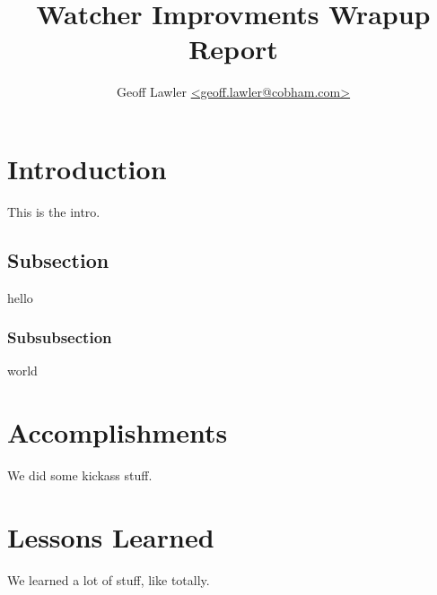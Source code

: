 \documentclass{report}
\author{Geoff Lawler \url{<geoff.lawler@cobham.com>}}
\title{Watcher Improvments Wrapup Report}
\begin{document}
\maketitle

\renewcommand*\thesection{\arabic{section}}

\section{Introduction}
This is the intro.

\subsection{Subsection}
hello
\subsubsection{Subsubsection}
world

\section{Accomplishments}
We did some kickass stuff.

\section{Lessons Learned}
We learned a lot of stuff, like totally.
\end{document}
